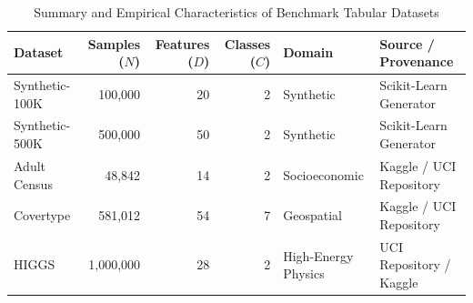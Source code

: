 \begin{table}[htbp]
\centering
\caption{Summary and Empirical Characteristics of Benchmark Tabular Datasets}
\label{tab:datasets}
\begin{tabular}{lrrrll}
\toprule
\textbf{Dataset} & \textbf{Samples ($N$)} & \textbf{Features ($D$)} & \textbf{Classes ($C$)} & \textbf{Domain} & \textbf{Source / Provenance} \\
\midrule
Synthetic-100K & 100,000 & 20 & 2 & Synthetic & Scikit-Learn Generator \\
Synthetic-500K & 500,000 & 50 & 2 & Synthetic & Scikit-Learn Generator \\
Adult Census \cite{kaggle_adult} & 48,842 & 14 & 2 & Socioeconomic & Kaggle / UCI Repository \\
Covertype \cite{kaggle_covertype} & 581,012 & 54 & 7 & Geospatial & Kaggle / UCI Repository \\
HIGGS \cite{baldi2014searching} & 1,000,000 & 28 & 2 & High-Energy Physics & UCI Repository / Kaggle \\
\bottomrule
\end{tabular}
\end{table}
